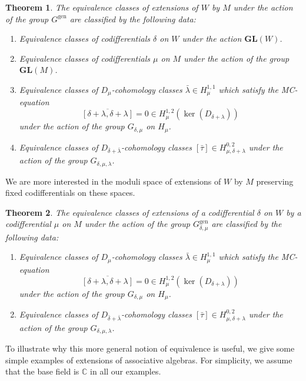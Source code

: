 \documentclass[12pt]{amsart}
\newtheorem{thm}{Theorem}[section]
\theoremstyle{definition}
\begin{document}
\begin{thm}\label{th6}
The equivalence classes of extensions of $W$ by $M$ under the
action of the group ${\mbox{$G^{\text{gen}}$}}$ are classified by the following data:
\begin{enumerate}
\item Equivalence classes of codifferentials $\delta$ on $W$ under the action
${{\mathbf{GL}}}(W)$.
\item Equivalence classes of codifferentials
$\mu$ on $M$ under the action of the group ${{\mathbf{GL}}}(M)$.
\item Equivalence classes of $D_\mu$-cohomology classes $\bar\lambda\in H_\mu^{1,1}$
which satisfy the MC-equation
$$\overline{[\delta+\lambda,\delta+\lambda]}=0\in H^{1,2}_\mu(\ker(D_{\delta+\lambda}))$$
under the action of the group ${\mbox{$G_{\delta,\mu}$}}$ on ${H_\mu}$.
\item Equivalence classes of $D_{\bar\delta+\bar\lambda}$-cohomology classes $[\bar\tau]\in H_{\mu,{\delta+\lambda}}^{0,2}$
under the action of the group ${\mbox{$G_{\delta,\mu,\lambda}$}}$.
\end{enumerate}
\end{thm}
We are more interested in the moduli space of extensions of $W$ by $M$ preserving fixed
codifferentials on these spaces.
\begin{thm}\label{th7}
The equivalence classes of extensions of a codifferential $\delta$
on $W$ by a codifferential $\mu$ on $M$ under the action of the
group ${\mbox{$G^{\text{gen}}_{\delta,\mu}$}}$ are classified by the following data:
\begin{enumerate}
\item Equivalence classes of $D_\mu$-cohomology classes $\bar\lambda\in H_\mu^{1,1}$
which satisfy the MC-equation
$$\overline{[\delta+\lambda,\delta+\lambda]}=0\in H^{1,2}_\mu(\ker(D_{\delta+\lambda}))$$
under the action of the group ${\mbox{$G_{\delta,\mu}$}}$ on ${H_\mu}$.
\item Equivalence classes of $D_{\bar\delta+\bar\lambda}$-cohomology classes $[\bar\tau]\in H_{\mu,{\delta+\lambda}}^{0,2}$
under the action of the group ${\mbox{$G_{\delta,\mu,\lambda}$}}$.
\end{enumerate}
\end{thm}
To illustrate why this more general notion of equivalence is useful, we give some simple examples
of extensions of associative algebras. For simplicity, we assume that the base field is ${\mbox{$\mathbb C$}}$ in
all our examples.
\end{document}
